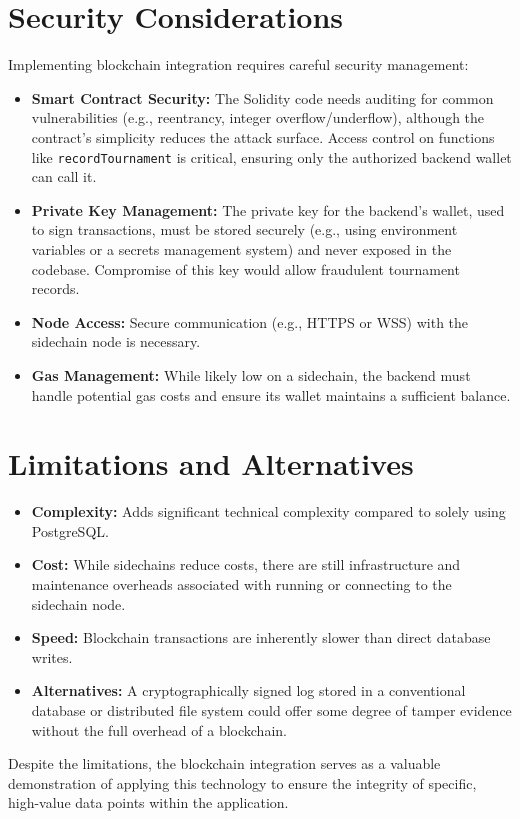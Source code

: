 \section{Security Considerations}
\label{sec:blockchain_security}
Implementing blockchain integration requires careful security management:
\begin{itemize}
    \item \textbf{Smart Contract Security:} The Solidity code needs auditing for common vulnerabilities (e.g., reentrancy, integer overflow/underflow), although the contract's simplicity reduces the attack surface. Access control on functions like \texttt{recordTournament} is critical, ensuring only the authorized backend wallet can call it.
    \item \textbf{Private Key Management:} The private key for the backend's wallet, used to sign transactions, must be stored securely (e.g., using environment variables or a secrets management system) and never exposed in the codebase. Compromise of this key would allow fraudulent tournament records.
    \item \textbf{Node Access:} Secure communication (e.g., HTTPS or WSS) with the sidechain node is necessary.
    \item \textbf{Gas Management:} While likely low on a sidechain, the backend must handle potential gas costs and ensure its wallet maintains a sufficient balance.
\end{itemize}

\section{Limitations and Alternatives}
\label{sec:blockchain_limits}
\begin{itemize}
    \item \textbf{Complexity:} Adds significant technical complexity compared to solely using PostgreSQL.
    \item \textbf{Cost:} While sidechains reduce costs, there are still infrastructure and maintenance overheads associated with running or connecting to the sidechain node.
    \item \textbf{Speed:} Blockchain transactions are inherently slower than direct database writes.
    \item \textbf{Alternatives:} A cryptographically signed log stored in a conventional database or distributed file system could offer some degree of tamper evidence without the full overhead of a blockchain.
\end{itemize}
Despite the limitations, the blockchain integration serves as a valuable demonstration of applying this technology to ensure the integrity of specific, high-value data points within the application.